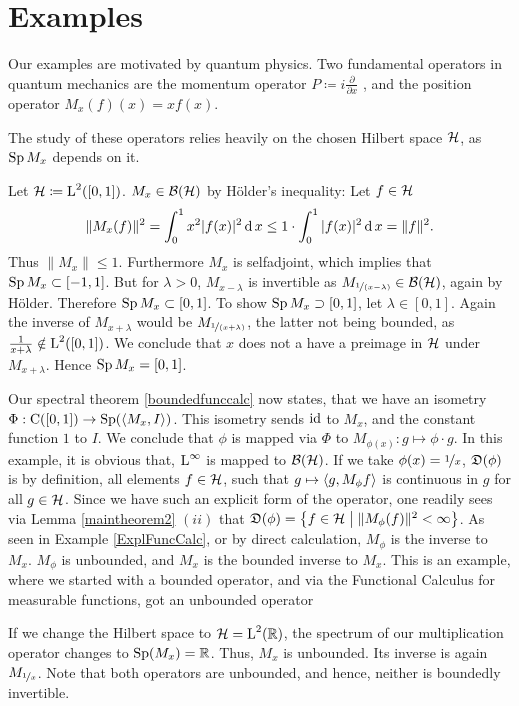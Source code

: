 \section{Examples}

Our examples are motivated by quantum physics. Two fundamental operators
in quantum mechanics are the momentum operator $P\coloneqq 
i \frac{\partial}{\partial x}$
, and the position operator $M_x(f)(x) = xf(x)$. 

\begin{rem}
The study of these operators relies heavily on the chosen Hilbert space $\mathcal{H}$, 
as $\operatorname{Sp} M_x$ depends on it.
\end{rem}
\begin{expl}\label{ExplMult}
 

Let $\mathcal{H} \coloneqq \text{L}^2(\left[ 0, 1 \right])$. $M_x \in \mathcal{B}(\mathcal{H})$ by Hölder's 
inequality: Let $f \in \mathcal{H}$
\[
 \| M_x(f) \|^2 = \int _0 ^1 x^2 | f(x)|^2 \operatorname{d} x \leq 
 1 \cdot \int _0 ^1 | f(x) |^2 \operatorname{d} x = \| f \| ^2.
\]
Thus $\| M_x\| \leq 1$. Furthermore $M_x$ is selfadjoint, which implies that
$\operatorname{Sp} M_x \subset \left[ -1 , 1 \right]$. But for $\lambda > 0$,
$M_{x-\lambda}$ is invertible as $M_{\nicefrac{1}{(x - \lambda)}} \in \mathcal{B}(\mathcal{H})$, again by
Hölder. Therefore $\operatorname{Sp} M_x \subset \left[ 0, 1\right]$. To show 
$\operatorname{Sp} M_x \supset \left[ 0, 1\right]$, let $\lambda \in  \left[ 0, 1\right]$.
Again the inverse of $M_{x+ \lambda}$ would be $M_{\nicefrac{1}{(x + \lambda)}}$,
the latter not being bounded, as $\frac{1}{x + \lambda} \notin 
\text{L}^2(\left[ 0, 1\right])$. We conclude that $x$ does not a have a preimage
in $\mathcal{H}$ under $M_{x + \lambda}$. Hence $\operatorname{Sp} M_x = \left[ 0 , 1\right]$.

Our spectral theorem \ref{boundedfunccalc} now states, that we have
an isometry $\Phi : \operatorname{C}(\left[0, 1\right]) \to \operatorname{Sp} (\left\langle M_x, I \right\rangle)$. This 
isometry sends $\operatorname{id}$ to $M_x$, and the constant function $1$ to $I$.
We conclude that $\phi$ is mapped via $\Phi$ to 
$M_{\phi(x)}: g \mapsto \phi \cdot g$. In this example, it is obvious that,
$\text{L}^\infty$ is mapped to $\mathcal{B}(\mathcal{H})$. If we take $\phi(x) = \nicefrac{1}{x}$, 
$\mathfrak{D}(\phi)$ is by definition, all elements $f \in \mathcal{H}$, such that
$g \mapsto \left\langle g, M_\phi f \right\rangle$ is continuous in $g$ for all $g \in \mathcal{H}$.
Since we have such an explicit form of the operator, one readily sees via 
Lemma \ref{maintheorem2} $(ii)$ that
$\mathfrak{D}(\phi) = \left\lbrace f \in \mathcal{H} \bigm | \|M_\phi (f)\|^2 < \infty \right\rbrace$.
As seen in Example \ref{ExplFuncCalc}, or by direct calculation, 
$M_\phi$ is the inverse to $M_x$. $M_\phi$ is unbounded, and $M_x$ is 
the bounded inverse to $M_x$. This is an example, where we started with
a bounded operator, and via the Functional Calculus for measurable 
functions, got an unbounded operator

If we change the Hilbert space to $\mathcal{H} = \text{L}^2 (\mathbb{R})$, the spectrum
of our multiplication operator changes to $\operatorname{Sp}(M_x) = \mathbb{R}$. Thus, $M_x$ 
is unbounded. Its inverse is again $M_{\nicefrac{1}{x}}$. Note that 
both operators are unbounded, and hence, neither is boundedly invertible.
\end{expl}

